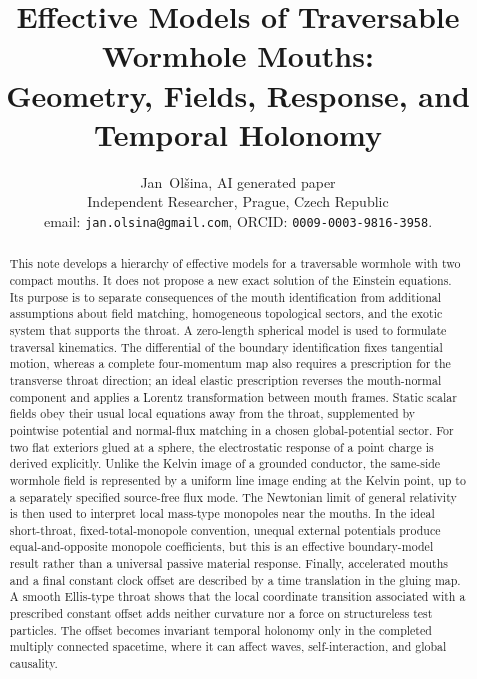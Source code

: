 \documentclass[journal,a4paper]{IEEEtran}
\begin{document}
\title{Effective Models of Traversable Wormhole Mouths:\\
Geometry, Fields, Response, and Temporal Holonomy}

\author{Jan~Ol\v{s}ina, AI generated paper\\[1ex]
Independent Researcher, Prague, Czech Republic\\
email: \texttt{jan.olsina@gmail.com}, ORCID: \texttt{0009-0003-9816-3958}.}

\maketitle

\begin{abstract}
This note develops a hierarchy of effective models for a traversable wormhole with two compact mouths. It does not propose a new exact solution of the Einstein equations. Its purpose is to separate consequences of the mouth identification from additional assumptions about field matching, homogeneous topological sectors, and the exotic system that supports the throat. A zero-length spherical model is used to formulate traversal kinematics. The differential of the boundary identification fixes tangential motion, whereas a complete four-momentum map also requires a prescription for the transverse throat direction; an ideal elastic prescription reverses the mouth-normal component and applies a Lorentz transformation between mouth frames. Static scalar fields obey their usual local equations away from the throat, supplemented by pointwise potential and normal-flux matching in a chosen global-potential sector. For two flat exteriors glued at a sphere, the electrostatic response of a point charge is derived explicitly. Unlike the Kelvin image of a grounded conductor, the same-side wormhole field is represented by a uniform line image ending at the Kelvin point, up to a separately specified source-free flux mode. The Newtonian limit of general relativity is then used to interpret local mass-type monopoles near the mouths. In the ideal short-throat, fixed-total-monopole convention, unequal external potentials produce equal-and-opposite monopole coefficients, but this is an effective boundary-model result rather than a universal passive material response. Finally, accelerated mouths and a final constant clock offset are described by a time translation in the gluing map. A smooth Ellis-type throat shows that the local coordinate transition associated with a prescribed constant offset adds neither curvature nor a force on structureless test particles. The offset becomes invariant temporal holonomy only in the completed multiply connected spacetime, where it can affect waves, self-interaction, and global causality.
\end{abstract}
\end{document}
